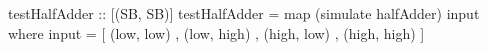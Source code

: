 \begin{haskellcode}
    testHalfAdder :: [(SB, SB)]
    testHalfAdder = map (simulate halfAdder) input
        where
            input = [ (low,  low)
                    , (low,  high)
                    , (high, low)
                    , (high, high)
                    ]
\end{haskellcode}

